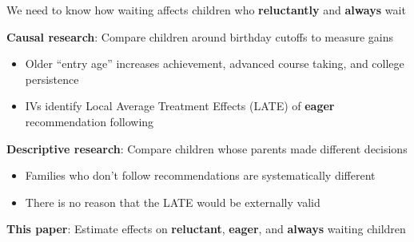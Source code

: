 \documentclass[t,aspectratio=169,11pt,presentation]{beamer}
\newenvironment{wideitemize}{\itemize\addtolength{\itemsep}{14pt}}{\enditemize}
\begin{document}
\begin{frame}{\textbf{}}

\begin{wideitemize}
    \item We need to know how waiting affects children who {\color{ptb4}\textbf{reluctantly}} and {\color{ptr5}\textbf{always}} wait
    
    \item<2-> \textbf{Causal research}: Compare children around birthday cutoffs to measure gains
    
    \begin{itemize}
        \item Older ``entry age'' increases achievement, advanced course taking, and college persistence
        
         {\tiny \color{gray}\citep[e.g.,][etc.]{datar2006does,deming2008lengthening,elder2009kindergarten,dhuey2019school,routon2020older}}
        
        \item<3-> IVs identify Local Average Treatment Effects (LATE) of {\color{ptr2}\textbf{eager}} recommendation following
        
    \end{itemize}
    
    \item<4-> \textbf{Descriptive research}: Compare children whose parents made different decisions
    

    \begin{itemize}
        \item Families who don't follow recommendations are systematically different
        
        {\tiny \color{gray} \citep[e.g.,][]{cameron1990effects,graue2000redshirting,march2005academic,schanzenbach2017your,fortner2017kindergarten}}
    
        \item<5-> There is no reason that the LATE would be externally valid
    \end{itemize}
    
    \item<6-> \textbf{This paper}: Estimate effects on {\color{ptb4}\textbf{reluctant}}, {\color{ptr2}\textbf{eager}}, and  {\color{ptr5}\textbf{always}} waiting children
    
    

\end{wideitemize}
\end{frame}
\end{document}
